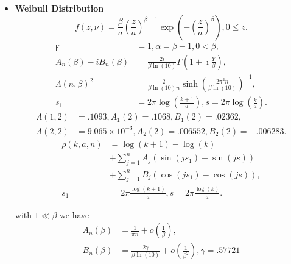 \documentclass[titlepage,fleqn]{article}%
\begin{document}
\begin{itemize}
\item \textbf{Weibull Distribution}
\[
f(z,\nu)=\frac{\beta}{a}\left(  \frac{z}{a}\right)  ^{\beta-1}\exp\left(
-\left(  \frac{z}{a}\right)  ^{\beta}\right)  ,0\leq z.
\]%
\begin{align*}
\digamma &  =1,\alpha=\beta-1,0<\beta,\\
A_{n}(\beta)-iB_{n}(\beta)  &  =\frac{2i}{\beta\ln(10)}\Gamma\left(
1+\imath\frac{Y}{\beta}\right)  ,\\
\Lambda(n,\beta)^{2}  &  =\frac{2}{\beta\ln(10)n}\sinh\left(  \frac{2\pi^{2}%
n}{\beta\ln(10)}\right)  ^{-1},\\
s_{1}  &  =2\pi\log\left(  \frac{k+1}{a}\right)  ,s=2\pi\log\left(  \frac
{k}{a}\right)  .
\end{align*}%
\begin{align*}
\Lambda(1,2)  &  =.1093,A_{1}(2)=.1068,B_{1}(2)=.02362,\\
\Lambda(2,2)  &  =9.065\times10^{-3},A_{2}(2)=.006552,B_{2}(2)=-.006283.
\end{align*}%
\begin{align*}
\rho(k,a,n)  &  =\log(k+1)-\log(k)\\
&  +%
{\displaystyle\sum\limits_{j=1}^{n}}
A_{j}(\sin(js_{1})-\sin(js))\\
&  +%
{\displaystyle\sum\limits_{j=1}^{n}}
B_{j}(\cos(js_{1})-\cos(js)),\\
s_{1}  &  =2\pi\frac{\log(k+1)}{a},s=2\pi\frac{\log(k)}{a}.
\end{align*}


\noindent with $1\ll\beta$ we have%
\begin{align*}
A_{n}(\beta)  &  =\frac{1}{\pi n}+o\left(  \frac{1}{\beta}\right)  ,\\
B_{n}(\beta)  &  =\frac{2\gamma}{\beta\ln(10)}+o\left(  \frac{1}{\beta^{2}%
}\right)  ,\gamma=.57721
\end{align*}



\end{itemize}
\end{document}
